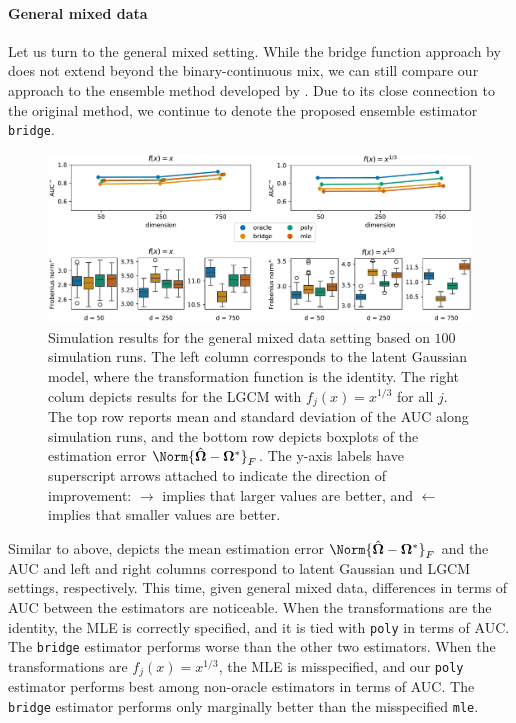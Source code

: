 \paragraph{General mixed data}
Let us turn to the general mixed setting. While the bridge function approach by \cite{Fan17} does not extend beyond the binary-continuous mix, we can still compare our approach to the ensemble method developed by \cite{Feng19}. Due to its close connection to the original method, we continue to denote the proposed ensemble estimator \texttt{bridge}.
\begin{figure}
    \centering
    \includegraphics[width=\textwidth]{Figures/simulation_results_general.pdf}
    \caption{Simulation results for the general mixed data setting based on \(100\) simulation runs. The left column corresponds to the latent Gaussian model, where the transformation function is the identity. The right colum depicts results for the LGCM with \(f_j(x) = x^{1/3}\) for all \(j\). The top row reports mean and standard deviation of the AUC along simulation runs, and the bottom row depicts boxplots of the estimation error $\Norm{\hat{\mathbf\Omega} - \mathbf\Omega^*}_F$. The y-axis labels have superscript arrows attached to indicate the direction of improvement: \(\rightarrow\) implies that larger values are better, and \(\leftarrow\) implies that smaller values are better.}
    \label{fig:bench_genral}
\end{figure}

Similar to above,  depicts the mean estimation error $\Norm{\hat{\mathbf\Omega} - \mathbf\Omega^*}_F$ and the AUC and left and right columns correspond to latent Gaussian und LGCM settings, respectively. This time, given general mixed data, differences in terms of AUC between the estimators are noticeable. When the transformations are the identity, the MLE is correctly specified, and it is tied with \texttt{poly} in terms of AUC. The \texttt{bridge} estimator performs worse than the other two estimators. When the transformations are $f_j(x) = x^{1/3}$, the MLE is misspecified, and our \texttt{poly} estimator performs best among non-oracle estimators in terms of AUC. The \texttt{bridge} estimator performs only marginally better than the misspecified \texttt{mle}.

